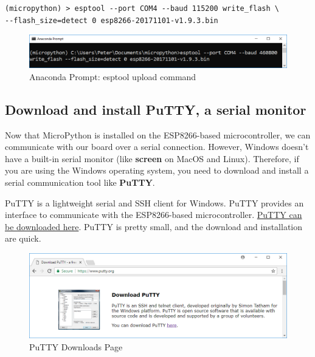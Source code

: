 \documentclass{book}
\makeatletter
\def\maxwidth{\ifdim\Gin@nat@width>\linewidth\linewidth
    \else\Gin@nat@width\fi}
\let\Oldincludegraphics\includegraphics
\renewcommand{\includegraphics}[1]{\Oldincludegraphics[width=.8\maxwidth]{#1}}
\makeatother
\begin{document}
\begin{lstlisting}
(micropython) > esptool --port COM4 --baud 115200 write_flash \
--flash_size=detect 0 esp8266-20171101-v1.9.3.bin
\end{lstlisting}

\begin{figure}
\centering
\includegraphics{images/esptool_write_flash.PNG}
\caption{Anaconda Prompt: esptool upload command}
\end{figure}
    




    
        \subsection{Download and install PuTTY, a serial
monitor}\label{download-and-install-putty-a-serial-monitor}
    




    
        Now that MicroPython is installed on the ESP8266-based microcontroller,
we can communicate with our board over a serial connection. However,
Windows doesn't have a built-in serial monitor (like \textbf{screen} on
MacOS and Linux). Therefore, if you are using the Windows operating
system, you need to download and install a serial communication tool
like \textbf{PuTTY}.

PuTTY is a lightweight serial and SSH client for Windows. PuTTY provides
an interface to communicate with the ESP8266-based microcontroller.
\href{https://www.putty.org/}{PuTTY can be downloaded here}. PuTTY is
pretty small, and the download and installation are quick.

\begin{figure}
\centering
\includegraphics{images/download_putty.PNG}
\caption{PuTTY Downloads Page}
\end{figure}
    
\end{document}
